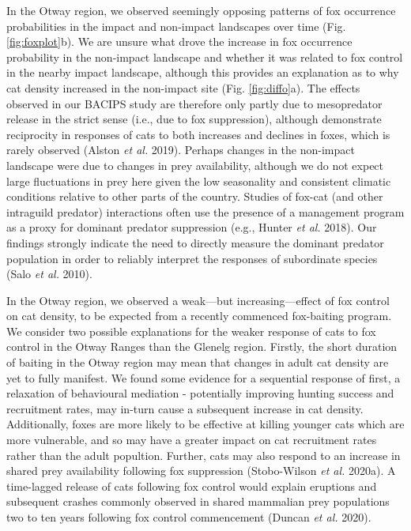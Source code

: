 \documentclass[11pt,a4paper,titlepage,twoside,openright]{style/unimelbthesis}
\begin{document}
\begin{mainmatter}
In the Otway region, we observed seemingly opposing patterns of fox occurrence probabilities in the impact and non-impact landscapes over time (Fig. \ref{fig:foxplot}b). We are unsure what drove the increase in fox occurrence probability in the non-impact landscape and whether it was related to fox control in the nearby impact landscape, although this provides an explanation as to why cat density increased in the non-impact site (Fig. \ref{fig:diffo}a). The effects observed in our BACIPS study are therefore only partly due to mesopredator release in the strict sense (i.e., due to fox suppression), although demonstrate reciprocity in responses of cats to both increases and declines in foxes, which is rarely observed (Alston \emph{et al.} 2019). Perhaps changes in the non-impact landscape were due to changes in prey availability, although we do not expect large fluctuations in prey here given the low seasonality and consistent climatic conditions relative to other parts of the country. Studies of fox-cat (and other intraguild predator) interactions often use the presence of a management program as a proxy for dominant predator suppression (e.g., Hunter \emph{et al.} 2018). Our findings strongly indicate the need to directly measure the dominant predator population in order to reliably interpret the responses of subordinate species (Salo \emph{et al.} 2010).

In the Otway region, we observed a weak---but increasing---effect of fox control on cat density, to be expected from a recently commenced fox-baiting program. We consider two possible explanations for the weaker response of cats to fox control in the Otway Ranges than the Glenelg region. Firstly, the short duration of baiting in the Otway region may mean that changes in adult cat density are yet to fully manifest. We found some evidence for a sequential response of first, a relaxation of behavioural mediation - potentially improving hunting success and recruitment rates, may in-turn cause a subsequent increase in cat density. Additionally, foxes are more likely to be effective at killing younger cats which are more vulnerable, and so may have a greater impact on cat recruitment rates rather than the adult popultion. Further, cats may also respond to an increase in shared prey availability following fox suppression (Stobo-Wilson \emph{et al.} 2020a). A time-lagged release of cats following fox control would explain eruptions and subsequent crashes commonly observed in shared mammalian prey populations two to ten years following fox control commencement (Duncan \emph{et al.} 2020).


\end{mainmatter}
\end{document}

